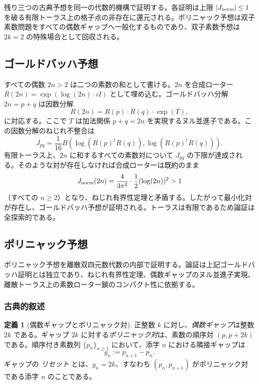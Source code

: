 \documentclass[dvipdfmx,a4paper]{article}
\theoremstyle{definition}
\newtheorem{definition}[theorem]{定義}
\theoremstyle{remark}
\newcommand{\Jnorm}{J_{\rm norm}}
\begin{document}
残り三つの古典予想を同一の代数的機構で証明する。各証明は上限 $|\Jnorm| \leq 1$ を破る有限トーラス上の格子点の非存在に還元される。ポリニャック予想は双子素数問題をすべての偶数ギャップへ一般化するものであり、双子素数予想は $2k = 2$ の特殊場合として回収される。

\subsection{ゴールドバッハ予想}

すべての偶数 $2n > 2$ は二つの素数の和として書ける。$2n$ を合成ローター $R(2n) = \exp(\log(2n) \cdot iI)$ として埋め込む。ゴールドバッハ分解 $2n = p + q$ は因数分解
\[
R(2n) = R(p) \cdot R(q) \cdot \exp(T),
\]
に対応する。ここで $T$ は加法関係 $p + q = 2n$ を実現するヌル並進子である。この因数分解のねじれ不整合は
\[
J_{pq} = \frac{1}{16} B(\log(R(p)^\dagger R(q)), \log(R(p)^\dagger R(q))).
\]
有限トーラス上、$2n$ に和するすべての素数対について $J_{pq}$ の下限が達成される。そのような対が存在しなければ合成ローターは既約のまま
\[
J_{\rm norm}(2n) = \frac{4}{3\pi^2} \cdot \frac12 (\log(2n))^2 > 1
\]
（すべての $n \geq 2$）となり、ねじれ有界性定理と矛盾する。したがって最小化対が存在し、ゴールドバッハ予想が証明される。トーラスは有限であるため論証は全探索的である。

\subsection{ポリニャック予想}

ポリニャック予想を離散双四元数代数の内部で証明する。論証は上記ゴールドバッハ証明とは独立であり、ねじれ有界性定理、偶数ギャップのヌル並進子実現、離散トーラス上の素数ローター鎖のコンパクト性に依拠する。

\subsubsection{古典的叙述}

\begin{definition}[偶数ギャップとポリニャック対]
\label{def:polignac-pair-ja}
正整数 $k$ に対し、\emph{偶数ギャップ}は整数 $2k$ である。ギャップ $2k$ に対する\emph{ポリニャック対}は、素数の順序対 $(p, p + 2k)$ である。順序付き素数列 $\{p_n\}_{n \geq 1}$ において、添字 $n$ における隣接ギャップは
\[
g_n := p_{n+1} - p_n.
\]
ギャップの \emph{リセット} とは、$g_n = 2k$、すなわち $(p_n, p_{n+1})$ がポリニャック対である添字 $n$ のことである。
\end{definition}
\end{document}
